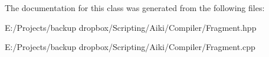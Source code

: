 The documentation for this class was generated from the following files\+:\begin{DoxyCompactItemize}
\item 
E\+:/\+Projects/backup dropbox/\+Scripting/\+Aiki/\+Compiler/Fragment.\+hpp\item 
E\+:/\+Projects/backup dropbox/\+Scripting/\+Aiki/\+Compiler/Fragment.\+cpp\end{DoxyCompactItemize}
